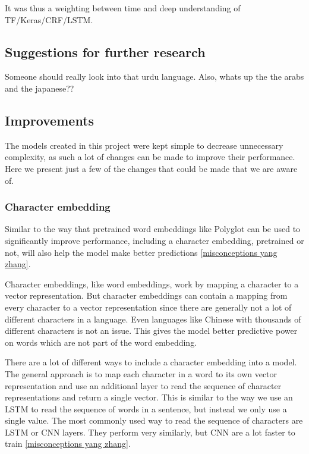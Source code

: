 It was thus a weighting between time and deep understanding of TF/Keras/CRF/LSTM.


\subsection{Suggestions for further research}

Someone should really look into that urdu language. Also, whats up the the arabs
and the japanese??

\subsection{Improvements}

The models created in this project were kept simple to decrease unnecessary
complexity, as such a lot of changes can be made to improve their performance.
Here we present just a few of the changes that could be made that we are aware
of.

\subsubsection{Character embedding}

Similar to the way that pretrained word embeddings like Polyglot can be used to
significantly improve performance, including a character embedding, pretrained
or not, will also help the model make better predictions \ref{misconceptions
yang zhang}.

Character embeddings, like word embeddings, work by mapping a character to a
vector representation. But character embeddings can contain a mapping from every
character to a vector representation since there are generally not a lot of
different characters in a language. Even languages like Chinese with thousands
of different characters is not an issue. This gives the model better predictive
power on words which are not part of the word embedding.

There are a lot of different ways to include a character embedding into a model.
The general approach is to map each character in a word to its own vector
representation and use an additional layer to read the sequence of character
representations and return a single vector. This is similar to the way we use an
LSTM to read the sequence of words in a sentence, but instead we only use a
single value. The most commonly used way to read the sequence of characters are
LSTM or CNN layers. They perform very similarly, but CNN are a lot faster to
train \ref{misconceptions yang zhang}.

